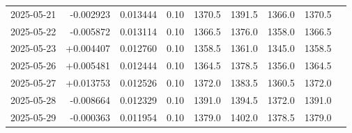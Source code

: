 \begin{tabularx}{\textwidth}{@{}c r r r r r r r r@{}}
2025-05-21 & -0.002923 & 0.013444 & 0.10 & 1370.5 & 1391.5 & 1366.0 & 1370.5\\
2025-05-22 & -0.005872 & 0.013114 & 0.10 & 1366.5 & 1376.0 & 1358.0 & 1366.5\\
2025-05-23 & +0.004407 & 0.012760 & 0.10 & 1358.5 & 1361.0 & 1345.0 & 1358.5\\
2025-05-26 & +0.005481 & 0.012444 & 0.10 & 1364.5 & 1378.5 & 1356.0 & 1364.5\\
2025-05-27 & +0.013753 & 0.012526 & 0.10 & 1372.0 & 1383.5 & 1360.5 & 1372.0\\
2025-05-28 & -0.008664 & 0.012329 & 0.10 & 1391.0 & 1394.5 & 1372.0 & 1391.0\\
2025-05-29 & -0.000363 & 0.011954 & 0.10 & 1379.0 & 1402.0 & 1378.5 & 1379.0\\
\bottomrule
\end{tabularx}


